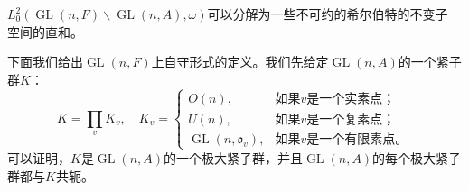 \begin{theorem}
$L^2_0\left( \operatorname{GL}(n,F)\backslash \operatorname{GL}(n,A), \omega \right)$可以分解为一些不可约的希尔伯特的不变子
空间的直和。
\end{theorem}

下面我们给出$\operatorname{GL}(n,F)$上自守形式的定义。我们先给定$\operatorname{GL}(n, A)$的一个紧子群$K$：
$$
K = \prod\limits_v K_v, \quad K_v = \begin{cases} O(n), & \text{如果$v$是一个实素点；} \\ U(n), & \text{如果$v$是一个复素点；} \\ \operatorname{GL}(n,\mathfrak{o}_v), & \text{如果$v$是一个有限素点。} \end{cases}
$$
可以证明，$K$是$\operatorname{GL}(n, A)$的一个极大紧子群，并且$\operatorname{GL}(n, A)$的每个极大紧子群都与$K$共轭。
